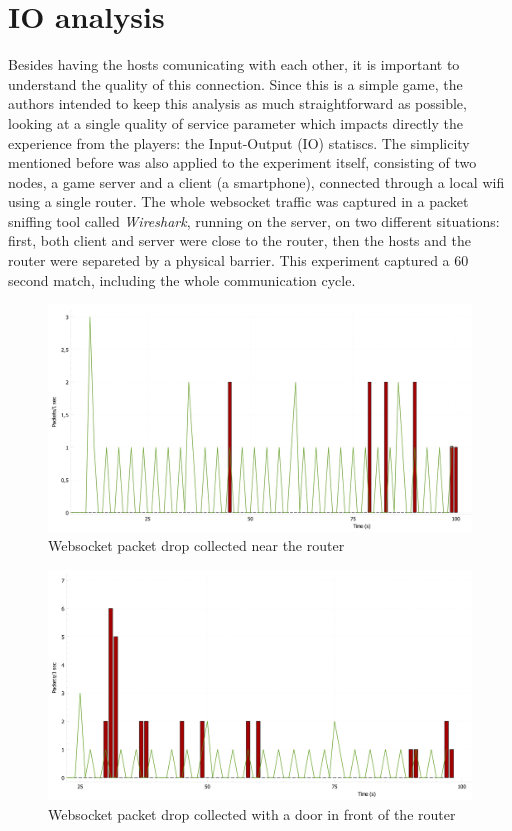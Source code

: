 \documentclass[english]{sbrt}
\begin{document}
\section{\textbf{IO analysis}}

Besides having the hosts comunicating with each other, it is important to understand the quality of this connection.
Since this is a simple game, the authors intended to keep this analysis as much straightforward as possible, looking at a
single quality of service parameter which impacts directly the experience from the players: the Input-Output (IO) statiscs. The simplicity mentioned before was
also applied to the experiment itself, consisting of two nodes, a game server and a client (a smartphone), connected through a local wifi using a single router. The whole websocket
traffic was captured in a packet sniffing tool called \textit{Wireshark}, running on the server, on two different situations: first, both client and server were close to the router, then the hosts and the router
were separeted by a physical barrier. This experiment captured a 60 second match, including the whole communication cycle.

\begin{figure}[H]
  \centering
  \includegraphics[width=12cm]{websocket traffic hall.jpg}
  \caption{Websocket packet drop collected near the router}
  \label{websocket-traffic-near}
\end{figure}

\begin{figure}[H]
  \centering
  \includegraphics[width=12cm]{websocket traffic bedroom.jpg}
  \caption{Websocket packet drop collected with a door in front of the router}
  \label{websocket-traffic-door}
\end{figure}
\end{document}
